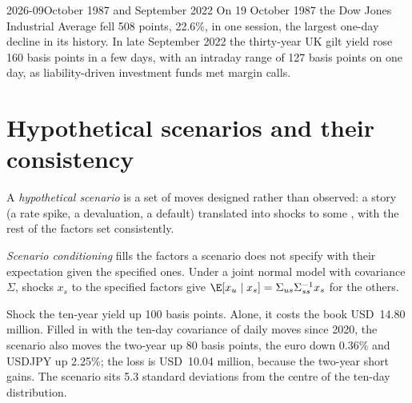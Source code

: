 \begin{dated}{2026-09}{October 1987 and September 2022}\label{dat:rc:stress-testing-and-scenarios:history}
On 19 October 1987 the Dow Jones Industrial Average fell 508 points, 22.6\%, in one session, the
largest one-day decline in its history. In late September 2022 the thirty-year UK gilt yield rose
160 basis points in a few days, with an intraday range of 127 basis points on one day, as
liability-driven investment funds met margin calls.
\end{dated}

\section{Hypothetical scenarios and their consistency}

\begin{definition}\label{def:rc:stress-testing-and-scenarios:hypothetical}
A \emph{hypothetical scenario} is a set of moves designed rather than
observed: a story (a rate spike, a devaluation, a default) translated into shocks to some , with the rest of the factors set consistently.
\end{definition}

\begin{definition}\label{def:rc:stress-testing-and-scenarios:conditioning}
\emph{Scenario conditioning} fills the factors a scenario does not
specify with their expectation given the specified ones. Under a joint normal model with
covariance $\Sigma$, shocks $x_s$ to the specified factors give $\E[x_u\mid x_s] = \Sigma_{us}\Sigma_{ss}^{-1}x_s$ for the
others.
\end{definition}

\label{lst:rc:stress-testing-and-scenarios:condition}

\begin{example}\label{ex:rc:stress-testing-and-scenarios:hypo}
Shock the ten-year yield up 100 basis points. Alone, it costs the book USD~14.80 million. Filled in
with the ten-day covariance of daily moves since 2020, the scenario also moves the two-year up 80
basis points, the euro down 0.36\% and USDJPY up 2.25\%; the loss is USD~10.04 million, because the
two-year short gains. The scenario sits 5.3 standard deviations from the centre of the ten-day
distribution.
\end{example}

